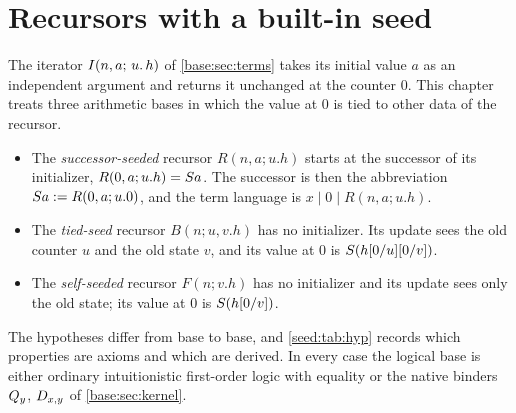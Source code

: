 \chapter{Recursors with a built-in seed}
\label{prov:ch:seed}
\label{seed:ch}

The iterator $I(n,a;\,u.\,h)$ of \cref{base:sec:terms} takes its initial value
$a$ as an independent argument and returns it unchanged at the counter $0$.
This chapter treats three arithmetic bases in which the value at $0$ is tied to
other data of the recursor.
\begin{itemize}[nosep]
\item The \emph{successor-seeded} recursor $R(n,a;u.h)$ starts at the successor
of its initializer, $R(0,a;u.h)=S a$. The successor is then the abbreviation
$S a\mathrel{:=} R(0,a;u.0)$, and the term language is $x\mid 0\mid R(n,a;u.h)$.
\item The \emph{tied-seed} recursor $B(n;u,v.h)$ has no initializer. Its update
sees the old counter $u$ and the old state $v$, and its value at $0$ is
$S(h[0/u][0/v])$.
\item The \emph{self-seeded} recursor $F(n;v.h)$ has no initializer and its
update sees only the old state; its value at $0$ is $S(h[0/v])$.
\end{itemize}
The hypotheses differ from base to base, and \cref{seed:tab:hyp} records which
properties are axioms and which are derived. In every case the logical base is
either ordinary intuitionistic first-order logic with equality or the native
binders $Q_{y}$, $D_{x,y}$ of \cref{base:sec:kernel}.

